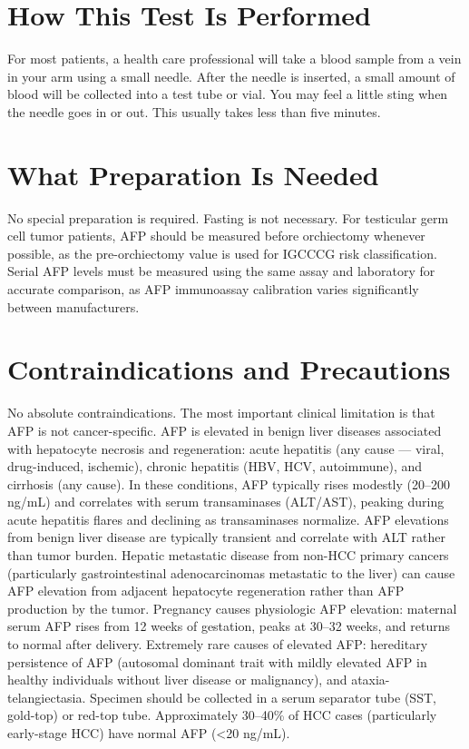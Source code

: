 \section*{How This Test Is Performed}
For most patients, a health care professional will take a blood sample from a vein in your arm using a small needle. After the needle is inserted, a small amount of blood will be collected into a test tube or vial. You may feel a little sting when the needle goes in or out. This usually takes less than five minutes.

\section*{What Preparation Is Needed}
No special preparation is required. Fasting is not necessary. For testicular germ cell tumor patients, AFP should be measured before orchiectomy whenever possible, as the pre-orchiectomy value is used for IGCCCG risk classification. Serial AFP levels must be measured using the same assay and laboratory for accurate comparison, as AFP immunoassay calibration varies significantly between manufacturers.

\section*{Contraindications and Precautions}
No absolute contraindications. The most important clinical limitation is that AFP is not cancer-specific. AFP is elevated in benign liver diseases associated with hepatocyte necrosis and regeneration: acute hepatitis (any cause --- viral, drug-induced, ischemic), chronic hepatitis (HBV, HCV, autoimmune), and cirrhosis (any cause). In these conditions, AFP typically rises modestly (20--200 ng/mL) and correlates with serum transaminases (ALT/AST), peaking during acute hepatitis flares and declining as transaminases normalize. AFP elevations from benign liver disease are typically transient and correlate with ALT rather than tumor burden. Hepatic metastatic disease from non-HCC primary cancers (particularly gastrointestinal adenocarcinomas metastatic to the liver) can cause AFP elevation from adjacent hepatocyte regeneration rather than AFP production by the tumor. Pregnancy causes physiologic AFP elevation: maternal serum AFP rises from 12 weeks of gestation, peaks at 30--32 weeks, and returns to normal after delivery. Extremely rare causes of elevated AFP: hereditary persistence of AFP (autosomal dominant trait with mildly elevated AFP in healthy individuals without liver disease or malignancy), and ataxia-telangiectasia. Specimen should be collected in a serum separator tube (SST, gold-top) or red-top tube. Approximately 30--40\% of HCC cases (particularly early-stage HCC) have normal AFP (<20 ng/mL).

